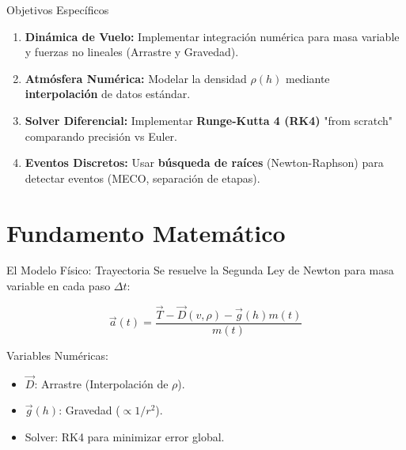 \documentclass[aspectratio=169]{beamer}
\begin{document}
\begin{frame}{Objetivos Específicos}
  \begin{enumerate}
      \item \textbf{Dinámica de Vuelo:} Implementar integración numérica para masa variable y fuerzas no lineales (Arrastre y Gravedad).
      \item \textbf{Atmósfera Numérica:} Modelar la densidad $\rho(h)$ mediante \textbf{interpolación} de datos estándar.
      \item \textbf{Solver Diferencial:} Implementar \textbf{Runge-Kutta 4 (RK4)} "from scratch" comparando precisión vs Euler.
      \item \textbf{Eventos Discretos:} Usar \textbf{búsqueda de raíces} (Newton-Raphson) para detectar eventos (MECO, separación de etapas).
  \end{enumerate}
\end{frame}


\section{Fundamento Matemático}

\begin{frame}{El Modelo Físico: Trayectoria}
  Se resuelve la Segunda Ley de Newton para masa variable en cada paso $\Delta t$:
  
  \begin{equation*}
    \vec{a}(t) = \frac{\vec{T} - \vec{D}(v, \rho) - \vec{g}(h) m(t)}{m(t)}
  \end{equation*}
  
  \vspace{0.5cm}
  Variables Numéricas:
  \begin{itemize}
      \item $\vec{D}$: Arrastre (Interpolación de $\rho$).
      \item $\vec{g}(h)$: Gravedad ($\propto 1/r^2$).
      \item Solver: RK4 para minimizar error global.
  \end{itemize}
\end{frame}
\end{document}
